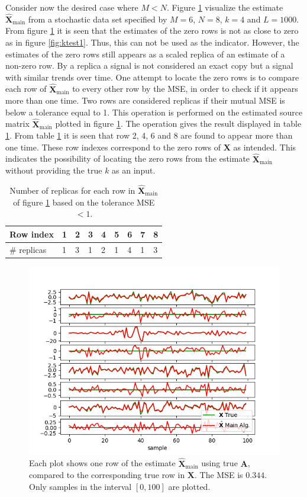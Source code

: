 \noindent
Consider now the desired case where $M < N$.
Figure \ref{fig:ktest3} visualize the estimate $\hat{\mathbf{X}}_{\text{main}}$ from a stochastic data set specified by $M = 6$, $N = 8$, $k = 4$ and $L = 1000$.
From figure \ref{fig:ktest3} it is seen that the estimates of the zero rows is not as close to zero as in figure \ref{fig:ktest1}. 
Thus, this can not be used as the indicator. 
However, the estimates of the zero rows still appears as a scaled replica of an estimate of a non-zero row. 
By a replica a signal is not considered an exact copy but a signal with similar trends over time.
One attempt to locate the zero rows is to compare each row of $\hat{\mathbf{X}}_{\text{main}}$ to every other row by the MSE, in order to check if it appears more than one time.
Two rows are considered replicas if their mutual MSE is below a tolerance equal to 1. 
This operation is performed on the estimated source matrix $\hat{\mathbf{X}}_{\text{main}}$ plotted in figure \ref{fig:ktest3}.
The operation gives the result displayed in table \ref{tab:replica1}.
From table \ref{tab:replica1} it is seen that row 2, 4, 6 and 8 are found to appear more than one time. These row indexes correspond to the zero rows of $\mathbf{X}$ as intended. 
This indicates the possibility of locating the zero rows from the estimate $\hat{\mathbf{X}}_{\text{main}}$ without providing the true $k$ as an input.      
\begin{table}[H]
\center
\begin{tabular}{|l|l|l|l|l|l|l|l|l|}
\hline
Row index   & 1 & 2 & 3 & 4 & 5 & 6 & 7 & 8 \\ \hline
\# replicas & 1 & 3 & 1 & 2 & 1 & 4 & 1 & 3 \\ \hline
\end{tabular}
\caption{Number of replicas for each row in $\hat{\mathbf{X}}_{\text{main}}$ of figure \ref{fig:ktest3} based on the tolerance MSE $< 1$. }
\label{tab:replica1}
\end{table}
\noindent
\begin{figure}[H]
	\centering
	\includegraphics[scale=0.5]{figures/ch_estimate/k_test3.png}
	\caption{Each plot shows one row of the estimate $\hat{\mathbf{X}}_{\text{main}}$ using true $\mathbf{A}$, compared to the corresponding true row in $\mathbf{X}$. The MSE is $0.344$. Only samples in the interval $[0,100]$ are plotted.}
	\label{fig:ktest3}
\end{figure}
